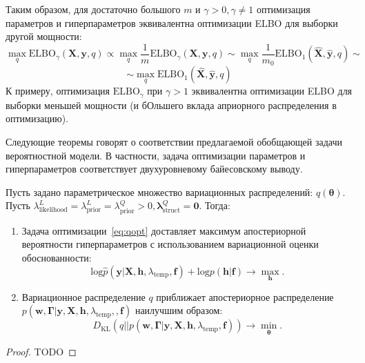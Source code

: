 Таким образом, для достаточно большого $m$ и $\gamma>0, \gamma \neq 1$ оптимизация параметров и гиперпараметров эквивалентна оптимизации ELBO для выборки другой мощности:
\[
    \max_q \text{ELBO}_{\gamma}(\mathbf{X}, \mathbf{y}, q) \propto  \max_q \frac{1}{m}\text{ELBO}_{\gamma}(\mathbf{X}, \mathbf{y}, q) \sim  \max_q \frac{1}{m_0}\text{ELBO}_{1}(\hat{\mathbf{X}}, \hat{\mathbf{y}}, q) \sim
\]
\[
\sim    \max_q \text{ELBO}_{1}(\hat{\mathbf{X}}, \hat{\mathbf{y}}, q)
\]
К примеру, оптимизация $\text{ELBO}_{\gamma}$ при $\gamma>1$ эквивалентна оптимизации ELBO для выборки меньшей мощности (и бОльшего вклада априорного распределения в оптимизацию).


Следующие теоремы говорят о соответствии предлагаемой обобщающей задачи вероятностной модели. В частности, задача оптимизации параметров и гиперпараметров соответствует двухуровневому байесовскому выводу.
\begin{theorem}
Пусть задано параметрическое множество вариационных распределений: $q(\boldsymbol{\theta})$. 
Пусть ${\lambda^L_\text{likelihood}} = {\lambda^L_\text{prior}=\lambda^Q_\text{prior}}>0, {\boldsymbol{\lambda}^Q_{\text{struct}}}=\mathbf{0}$. Тогда:
\begin{enumerate}
\item Задача оптимизации~\eqref{eq:qopt} доставляет максимум апостериорной вероятности гиперпараметров с использованием вариационной оценки обоснованности:
\vspace{-0.3cm}
\[
    \text{log}\hat{p}(\mathbf{y}|\mathbf{X}, \mathbf{h}, \lambda_\text{temp}, \mathbf{f}) + {\text{log}p(\mathbf{h}|\mathbf{f})} \to \max_{\mathbf{h}}.
\]
\item Вариационное распределение $q$ приближает апостериорное распределение $p(\mathbf{w}, \boldsymbol{\Gamma}|\mathbf{y}, \mathbf{X}, \mathbf{h}, \lambda_\text{temp},, \mathbf{f})$ наилучшим образом:
\vspace{-0.3cm}
\[
    {D}_\text{KL}(q||p(\mathbf{w}, \boldsymbol{\Gamma}|\mathbf{y}, \mathbf{X}, \mathbf{h}, \lambda_\text{temp}, \mathbf{f})) \to \min_{\boldsymbol{\theta}}.
\]
\end{enumerate}
\end{theorem}
\begin{proof}
TODO
\end{proof}
